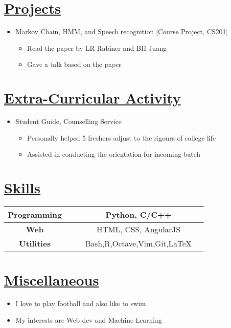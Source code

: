 \documentclass{article}
\begin{document}
\section*{\underline{Projects}}
\begin{itemize}
\item Markov Chain, HMM, and Speech recognition [Course Project, CS201]
\begin{itemize}
\item Read the paper by LR Rabiner and BH Juang
\item Gave a talk based on the paper
\end{itemize}
\end{itemize}
\section*{\underline{Extra-Curricular Activity}}
\begin{itemize}
\item Student Guide, Counselling Service
\begin{itemize}
\item Personally helped 5 freshers adjust to the rigours of college life
\item Assisted in conducting the orientation for incoming batch
\end{itemize}
\end{itemize}

\section*{\underline{Skills}}
\begin{tabular}{ | c c c | c  c |}
    \hline
    \textbf{Programming} & & & Python, C/C++ &\\
    \hline
    \textbf{Web} & & & HTML, CSS, AngularJS & \\
    \hline
    \textbf{Utilities} & & & Bash,R,Octave,Vim,Git,\LaTeX &\\
    \hline
\end{tabular}

\section*{\underline{Miscellaneous}}
\begin{itemize}
\item I love to play football and also like to swim
\item My interests are Web dev and Machine Learning
\end{itemize}
\end{document}
